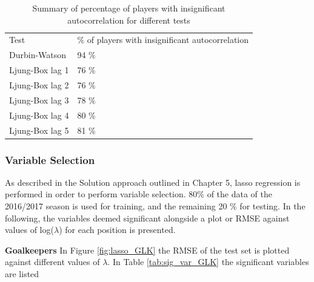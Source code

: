 \begin{table}[H]
\centering
\caption{Summary of percentage of players with insignificant autocorrelation for different tests}
\label{tab:auto_tests}
\begin{tabular}{ll}
Test            & \% of players with insignificant autocorrelation \\
Durbin-Watson   & 94 \%                                            \\
Ljung-Box lag 1 & 76 \%                                            \\
Ljung-Box lag 2 & 76 \%                                            \\
Ljung-Box lag 3 & 78 \%                                            \\
Ljung-Box lag 4 & 80 \%                                            \\
Ljung-Box lag 5 & 81 \%                                           
\end{tabular}
\end{table}

\subsubsection{Variable Selection}

As described in the Solution approach outlined in Chapter 5, lasso regression is performed in order to perform variable selection. 80\% of the data of the 2016/2017 season is used for training, and the remaining 20 \% for testing. In the following, the variables deemed significant alongside a plot or RMSE against values of log($\lambda$) for each position is presented.\newpar

\textbf{Goalkeepers}
In Figure \ref{fig:lasso_GLK} the RMSE of the test set is plotted against different values of $\lambda$. In Table \ref{tab:sig_var_GLK} the significant variables are listed

